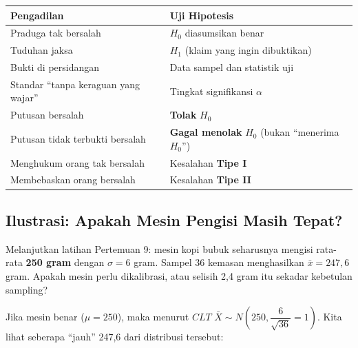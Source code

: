 \documentclass[
  indonesian,
  letterpaper,
]{book}
\newcounter{none} %
\begin{document}
{\def\LTcaptype{none} %
\begin{longtable}[]{@{}
  >{\raggedright\arraybackslash}p{}
  >{\raggedright\arraybackslash}p{}@{}}
\toprule\noalign{}
\begin{minipage}[b]{\linewidth}\raggedright
Pengadilan
\end{minipage} & \begin{minipage}[b]{\linewidth}\raggedright
Uji Hipotesis
\end{minipage} \\
\midrule\noalign{}
\endhead
\bottomrule\noalign{}
\endlastfoot
Praduga tak bersalah & \(H_0\) diasumsikan benar \\
Tuduhan jaksa & \(H_1\) (klaim yang ingin dibuktikan) \\
Bukti di persidangan & Data sampel dan statistik uji \\
Standar ``tanpa keraguan yang wajar'' & Tingkat signifikansi
\(\alpha\) \\
Putusan bersalah & \textbf{Tolak} \(H_0\) \\
Putusan tidak terbukti bersalah & \textbf{Gagal menolak} \(H_0\) (bukan
``menerima \(H_0\)'') \\
Menghukum orang tak bersalah & Kesalahan \textbf{Tipe I} \\
Membebaskan orang bersalah & Kesalahan \textbf{Tipe II} \\
\end{longtable}
}

\subsection{Ilustrasi: Apakah Mesin Pengisi Masih
Tepat?}\label{ilustrasi-apakah-mesin-pengisi-masih-tepat}

Melanjutkan latihan Pertemuan 9: mesin kopi bubuk seharusnya mengisi
rata-rata \textbf{250 gram} dengan \(\sigma = 6\) gram. Sampel 36
kemasan menghasilkan \(\bar{x} = 247{,}6\) gram. Apakah mesin perlu
dikalibrasi, atau selisih 2,4 gram itu sekadar kebetulan sampling?

Jika mesin benar (\(\mu = 250\)), maka menurut \(CLT\)
\(\bar{X} \sim N\left(250, \dfrac{6}{\sqrt{36}} = 1\right)\). Kita lihat
seberapa ``jauh'' 247,6 dari distribusi tersebut:
\end{document}
